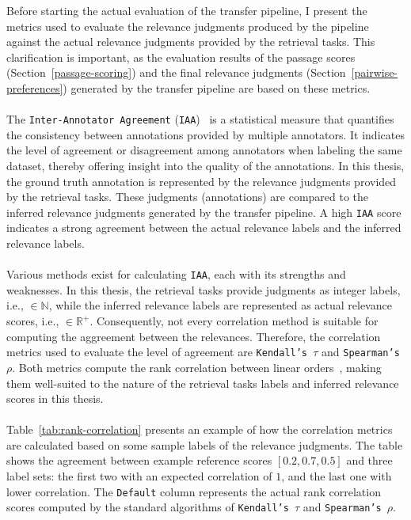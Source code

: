 Before starting the actual evaluation of the transfer pipeline, I present the metrics used to evaluate the relevance judgments produced by the pipeline against the actual relevance judgments provided by the retrieval tasks. This clarification is important, as the evaluation results of the passage scores (Section~\ref{passage-scoring}) and the final relevance judgments (Section~\ref{pairwise-preferences}) generated by the transfer pipeline are based on these metrics.
\\\\
The \texttt{Inter-Annotator Agreement} (\texttt{IAA})~\citep{artstein:2017} is a statistical measure that quantifies the consistency between annotations provided by multiple annotators. It indicates the level of agreement or disagreement among annotators when labeling the same dataset, thereby offering insight into the quality of the annotations. In this thesis, the ground truth annotation is represented by the relevance judgments provided by the retrieval tasks. These judgments (annotations) are compared to the inferred relevance judgments generated by the transfer pipeline. A high \texttt{IAA} score indicates a strong agreement between the actual relevance labels and the inferred relevance labels.
\\\\
Various methods exist for calculating \texttt{IAA}, each with its strengths and weaknesses. In this thesis, the retrieval tasks provide judgments as integer labels, i.e., $\in \mathbb{N}$, while the inferred relevance labels are represented as actual relevance scores, i.e., $\in \mathbb{R}^{+}$. Consequently, not every correlation method is suitable for computing the aggreement between the relevances. Therefore, the correlation metrics used to evaluate the level of agreement are \texttt{Kendall's $\tau$} and \texttt{Spearman's $\rho$}. Both metrics compute the rank correlation between linear orders~\citep{monjardet:1998}, making them well-suited to the nature of the retrieval tasks labels and inferred relevance scores in this thesis.
\\\\
Table~\ref{tab:rank-correlation} presents an example of how the correlation metrics are calculated based on some sample labels of the relevance judgments. The table shows the agreement between example reference scores $[0.2, 0.7, 0.5]$ and three label sets: the first two with an expected correlation of $1$, and the last one with lower correlation. The \texttt{Default} column represents the actual rank correlation scores computed by the standard algorithms of \texttt{Kendall's $\tau$} and \texttt{Spearman's $\rho$}.
